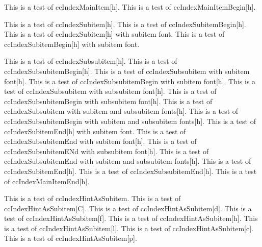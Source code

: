 \documentclass{article}
\begin{document}
{{{{\pagebreak

This is a test of ccIndexMainItem[h].
This is a test of ccIndexMainItemBegin[h].

This is a test of ccIndexSubitem[h].
This is a test of ccIndexSubitemBegin[h].
This is a test of ccIndexSubitem[h] with subitem font.
This is a test of ccIndexSubitemBegin[h] with subitem font.

This is a test of ccIndexSubsubitem[h].
This is a test of ccIndexSubsubitemBegin[h].
This is a test of ccIndexSubsubitem with subitem font[h].
This is a test of ccIndexSubsubitemBegin with subitem font[h].
This is a test of ccIndexSubsubitem with subsubitem font[h].
This is a test of ccIndexSubsubitemBegin with subsubitem font[h].
This is a test of ccIndexSubsubitem with subitem and subsubitem fonts[h].
This is a test of ccIndexSubsubitemBegin with subitem and subsubitem fonts[h].
\pagebreak
This is a test of ccIndexSubitemEnd[h] with subitem font.
This is a test of ccIndexSubsubitemEnd with subitem font[h].
This is a test of ccIndexSubsubitemENd with subsubitem font[h].
This is a test of ccIndexSubsubitemEnd with subitem and subsubitem fonts[h].
This is a test of ccIndexSubitemEnd[h].
This is a test of ccIndexSubsubitemEnd[h].
This is a test of ccIndexMainItemEnd[h].

This is a test of ccIndexHintAsSubitem.
This is a test of ccIndexHintAsSubitem[C].
This is a test of ccIndexHintAsSubitem[d].
This is a test of ccIndexHintAsSubitem[f].
This is a test of ccIndexHintAsSubitem[h].
This is a test of ccIndexHintAsSubitem[l].
This is a test of ccIndexHintAsSubitem[c].
This is a test of ccIndexHintAsSubitem[p].

}}}}
\end{document}
